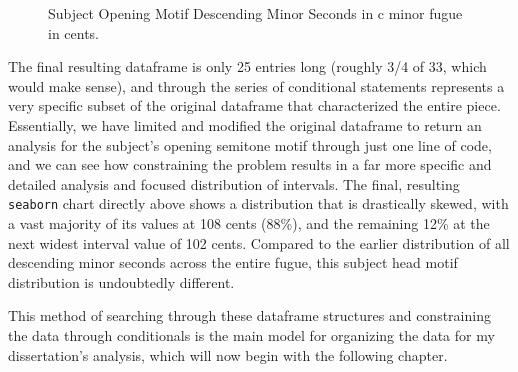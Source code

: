 \begin{figure}[H]
\vspace{1.5em}
    \centering
    \caption{ Subject Opening Motif Descending Minor Seconds in c minor fugue in cents. }
\end{figure}    The final resulting dataframe is only 25 entries long (roughly 3/4 of
33, which would make sense), and through the series of conditional
statements represents a very specific subset of the original dataframe
that characterized the entire piece. Essentially, we have limited and
modified the original dataframe to return an analysis for the subject's
opening semitone motif through just one line of code, and we can see how
constraining the problem results in a far more specific and detailed
analysis and focused distribution of intervals. The final, resulting
\texttt{seaborn} chart directly above shows a distribution that is
drastically skewed, with a vast majority of its values at 108 cents
(88\%), and the remaining 12\% at the next widest interval value of 102
cents. Compared to the earlier distribution of all descending minor
seconds across the entire fugue, this subject head motif distribution is
undoubtedly different.

This method of searching through these dataframe structures and
constraining the data through conditionals is the main model for
organizing the data for my dissertation's analysis, which will now begin
with the following chapter.


    
    
    
